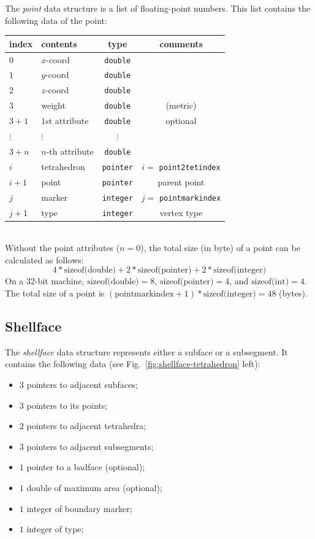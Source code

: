 The {\it point} data structure is a list of floating-point numbers. This list contains the following data of the point:\\
\begin{tabular}{l | l | c | c }
 index & contents & type & comments\\ \hline
 $0$ & $x$-coord & {\tt double} & \\
 $1$ & $y$-coord & {\tt double} & \\
 $2$ & $z$-coord & {\tt double} & \\ \hline
 $3$ & weight    & {\tt double} & (metric) \\ \hline
 $3+1$ & $1$st attribute & {\tt double} & optional \\
 $\vdots$ & $\vdots$ & $\vdots$ & \\
 $3 + n$ & $n$-th attribute & {\tt double} & \\ \hline
 $i$ & tetrahedron & {\tt pointer} & $i =$ {\tt point2tetindex} \\
 $i + 1$ & point & {\tt pointer} & parent point\\ \hline
 $j$ & marker & {\tt integer} & $j = $ {\tt pointmarkindex}\\
 $j + 1$ & type & {\tt integer} & vertex type
\end{tabular}\\

Without the point attributes ($n = 0$), the total size (in byte) of a point can be calculated as follows:
\[
  4 * \textrm{sizeof(double)} + 2 * \textrm{sizeof(pointer)} + 2 * \textrm{sizeof(integer)}
\]
On a $32$-bit machine, $\textrm{sizeof(double)} = 8$, $\textrm{sizeof(pointer)} = 4$, and $\textrm{sizeof(int)} = 4$. The total size of a point is $(\textrm{pointmarkindex} + 1) * \textrm{sizeof(integer)} = 48$ (bytes).

\subsection{Shellface}

The {\it shellface} data structure represents either a subface or a subsegment. It contains the following data (see Fig.~\ref{fig:shellface-tetrahedron} left):
\begin{itemize}
\item $3$ pointers to adjacent subfaces;
\item $3$ pointers to its points;
\item $2$ pointers to adjacent tetrahedra;
\item $3$ pointers to adjacent subsegments;
\item $1$ pointer to a badface (optional);
\item $1$ double of maximum area (optional);
\item $1$ integer of boundary marker;
\item $1$ integer of type;
\end{itemize}

